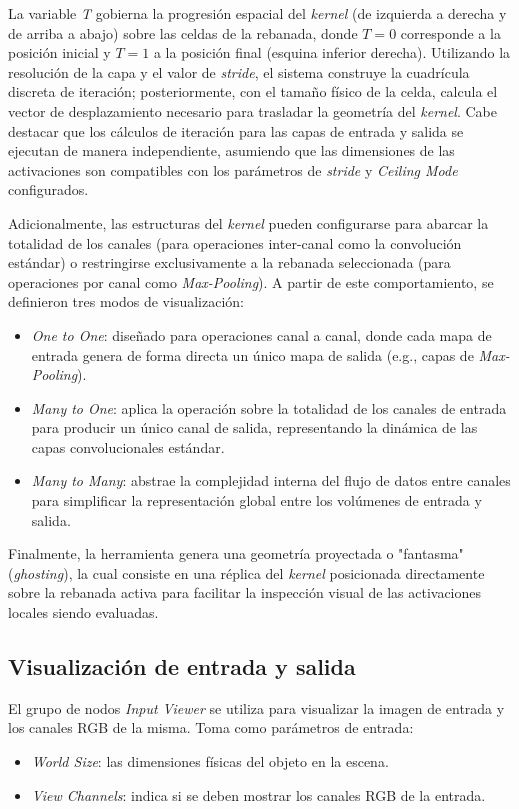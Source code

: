 La variable \textit{T} gobierna la progresión espacial del \textit{kernel} (de izquierda a derecha y 
de arriba a abajo) sobre las celdas de la rebanada, donde $T = 0$ corresponde a la posición inicial 
y $T = 1$ a la posición final (esquina inferior derecha). Utilizando la resolución de la capa y 
el valor de \textit{stride}, el sistema construye la cuadrícula discreta de iteración; posteriormente, 
con el tamaño físico de la celda, calcula el vector de desplazamiento necesario para trasladar 
la geometría del \textit{kernel}. Cabe destacar que los cálculos de iteración para las capas de 
entrada y salida se ejecutan de manera independiente, asumiendo que las dimensiones de las activaciones 
son compatibles con los parámetros de \textit{stride} y \textit{Ceiling Mode} configurados.
\medskip

Adicionalmente, las estructuras del \textit{kernel} pueden configurarse para abarcar la totalidad de 
los canales (para operaciones inter-canal como la convolución estándar) o restringirse 
exclusivamente a la rebanada seleccionada (para operaciones por canal como \textit{Max-Pooling}). 
A partir de este comportamiento, se definieron tres modos de visualización:
\begin{itemize}
    \item \textit{One to One}: diseñado para operaciones canal a canal, donde cada mapa de entrada 
    genera de forma directa un único mapa de salida (e.g., capas de \textit{Max-Pooling}).
    \item \textit{Many to One}: aplica la operación sobre la totalidad de los canales de entrada 
    para producir un único canal de salida, representando la dinámica de las capas convolucionales 
    estándar.
    \item \textit{Many to Many}: abstrae la complejidad interna del flujo de datos entre canales 
    para simplificar la representación global entre los volúmenes de entrada y salida.
\end{itemize}

Finalmente, la herramienta genera una geometría proyectada o "fantasma" (\textit{ghosting}), la cual 
consiste en una réplica del \textit{kernel} posicionada directamente sobre la rebanada activa para 
facilitar la inspección visual de las activaciones locales siendo evaluadas.

\subsection{Visualización de entrada y salida}
El grupo de nodos \textit{Input Viewer} se utiliza para visualizar la imagen de entrada
y los canales RGB de la misma. Toma como parámetros de entrada:
\begin{itemize}
    \item \textit{World Size}: las dimensiones físicas del objeto en la escena.
    \item \textit{View Channels}: indica si se deben mostrar los canales RGB de la entrada.
\end{itemize}

